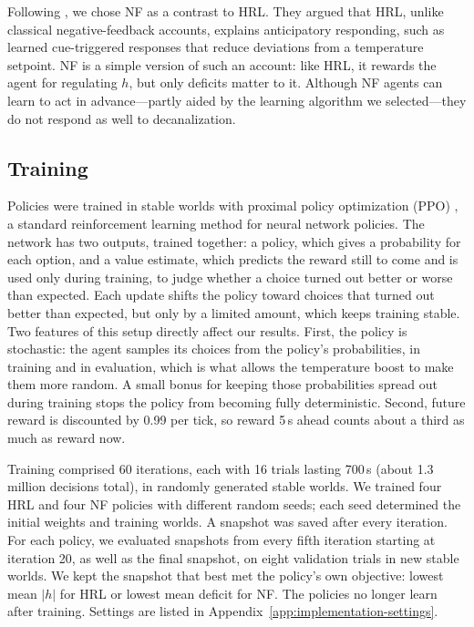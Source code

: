 \documentclass[12pt,fleqn]{article}
\begin{document}
Following \citet{keramati_homeostatic_2014}, we chose NF as a contrast to HRL. They argued that HRL, unlike classical negative-feedback accounts, explains anticipatory responding, such as learned cue-triggered responses that reduce deviations from a temperature setpoint. NF is a simple version of such an account: like HRL, it rewards the agent for regulating $h$, but only deficits matter to it. Although NF agents can learn to act in advance---partly aided by the learning algorithm we selected---they do not respond as well to decanalization.

\subsection{Training}\label{sec:training}

Policies were trained in stable worlds with proximal policy optimization (PPO) \citep{schulman_proximal_2017}, a standard reinforcement learning method for neural network policies. The network has two outputs, trained together: a policy, which gives a probability for each option, and a value estimate, which predicts the reward still to come and is used only during training, to judge whether a choice turned out better or worse than expected. Each update shifts the policy toward choices that turned out better than expected, but only by a limited amount, which keeps training stable. Two features of this setup directly affect our results. First, the policy is stochastic: the agent samples its choices from the policy's probabilities, in training and in evaluation, which is what allows the temperature boost to make them more random. A small bonus for keeping those probabilities spread out during training stops the policy from becoming fully deterministic. Second, future reward is discounted by 0.99 per tick, so reward 5\,s ahead counts about a third as much as reward now.

Training comprised 60 iterations, each with 16 trials lasting 700\,s (about 1.3 million decisions total), in randomly generated stable worlds. We trained four HRL and four NF policies with different random seeds; each seed determined the initial weights and training worlds. A snapshot was saved after every iteration. For each policy, we evaluated snapshots from every fifth iteration starting at iteration 20, as well as the final snapshot, on eight validation trials in new stable worlds. We kept the snapshot that best met the policy's own objective: lowest mean $|h|$ for HRL or lowest mean deficit for NF. The policies no longer learn after training. Settings are listed in Appendix~\ref{app:implementation-settings}.
\end{document}
